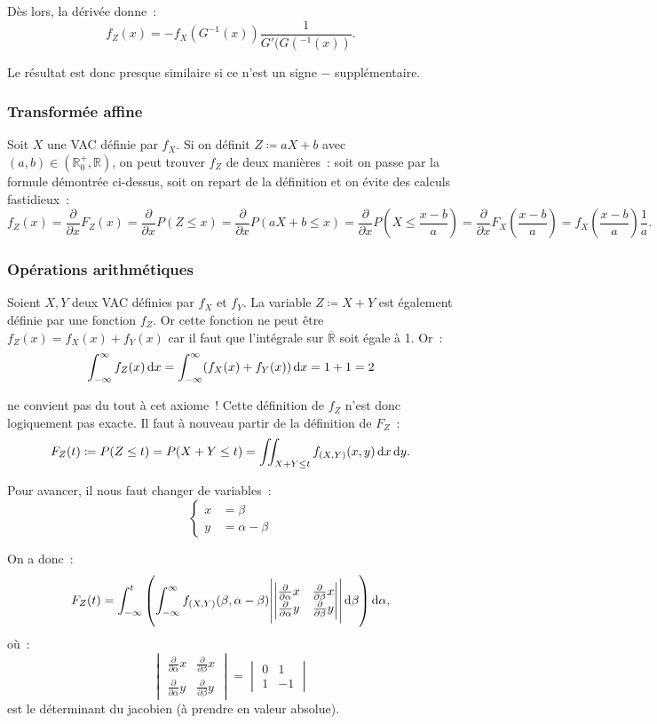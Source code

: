 \documentclass{article}
\renewcommand{\pd}[1]{\frac {\partial}{\partial #1}}
\begin{document}
			Dès lors, la dérivée donne~:
			\[f_Z(x) = -f_X(G^{-1}(x))\frac 1{G'(G(^{-1}(x))}.\]

			Le résultat est donc presque similaire si ce n'est un signe $-$ supplémentaire.

		\subsubsection{Transformée affine}
			Soit $X$ une VAC définie par $f_X$. Si on définit $Z \coloneqq aX + b$ avec $(a, b) \in (\mathbb R_0^+, \mathbb R)$, on peut trouver $f_Z$ de deux manières~:
			soit on passe par la formule démontrée ci-dessus, soit on repart de la définition et on évite des calculs fastidieux~:
			\[f_Z(x) = \pd xF_Z(x) = \pd xP(Z \leq x) = \pd xP(aX + b \leq x) = \pd xP\left(X \leq \frac {x-b}{a}\right) = \pd xF_X\left(\frac {x-b}a\right)
				= f_X\left(\frac {x-b}a\right)\frac 1a.\]

		\subsubsection{Opérations arithmétiques}
			Soient $X, Y$ deux VAC définies par $f_X$ et $f_Y$. La variable $Z \coloneqq X + Y$ est également définie par une fonction $f_Z$. Or cette fonction ne peut
			être $f_Z(x) = f_X(x) + f_Y(x)$ car il faut que l'intégrale sur $\overline {\mathbb R}$ soit égale à 1. Or~:
			\[\int_{-\infty}^\infty f_Z(x)\dif x = \int_{-\infty}^\infty(f_X(x) + f_Y(x))\dif x = 1 + 1 = 2\]

			ne convient pas du tout à cet axiome~! Cette définition de $f_Z$ n'est donc logiquement pas exacte. Il faut à nouveau partir de la définition de $F_Z$~:
			\[F_Z(t) \coloneqq P(Z \leq t) = P(X+Y \leq t) = \iint_{X+Y \leq t}f_{(X, Y)}(x, y)\dif x\dif y.\]

			Pour avancer, il nous faut changer de variables~:
			\[\left\{\begin{aligned}
				x &= \beta\\
				y  &= \alpha - \beta
			\end{aligned}\right.\]

			On a donc~:
			\[F_Z(t) = \int_{-\infty}^t\left(\int_{-\infty}^\infty f_{(X, Y)}(\beta, \alpha-\beta)\abs{\begin{vmatrix}\pd \alpha x & \pd \beta x \\ \pd \alpha y & \pd \beta y\end{vmatrix}}\dif \beta\right)\dif\alpha,\]
			où~:
			\[\begin{vmatrix}\pd \alpha x & \pd \beta x \\ \pd \alpha y & \pd \beta y\end{vmatrix} = \begin{vmatrix}0 & 1 \\1 & -1\end{vmatrix}\]
			est le déterminant du jacobien (à prendre en valeur absolue).
\end{document}
